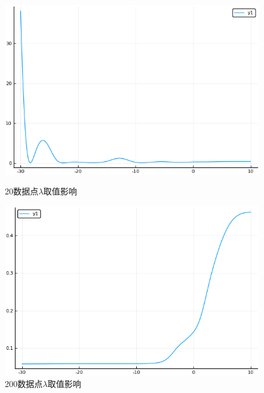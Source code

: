 \documentclass{ML}
\begin{document}
\begin{figure}[H]
	\begin{minipage}[c]{0.5\linewidth}
		\centering
		\includegraphics[width=0.9\linewidth]{media/20/ResolveWithLambda-lambda-err}
		\caption{20数据点$\lambda$取值影响}
		\label{fig:resolvelambdaerr20}
	\end{minipage}
	\begin{minipage}[c]{0.5\linewidth}
		\centering
		\includegraphics[width=0.9\linewidth]{media/200/ResolveWithLambda-lambda-err}
		\caption{200数据点$\lambda$取值影响}
		\label{fig:resolvelambdaerr200}
	\end{minipage}
\end{figure}
\end{document}
